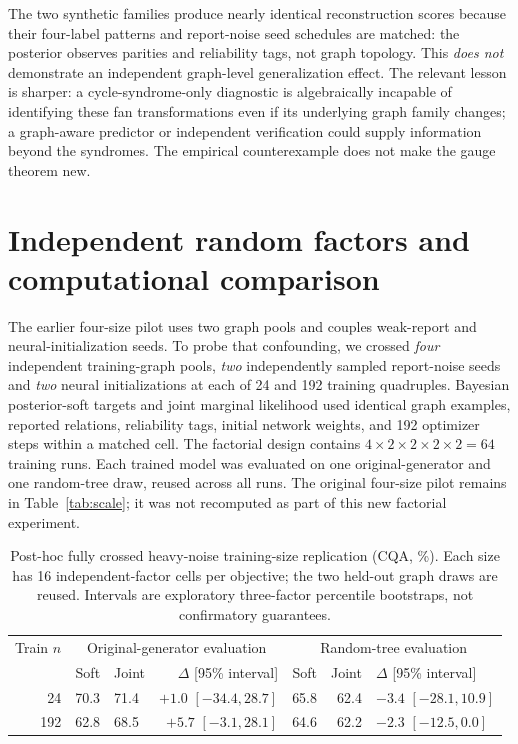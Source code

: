 \documentclass[10pt]{article}
\begin{document}
The two synthetic families produce nearly identical reconstruction scores because their four-label patterns and report-noise seed schedules are matched: the posterior observes parities and reliability tags, not graph topology. This \emph{does not} demonstrate an independent graph-level generalization effect. The relevant lesson is sharper: a cycle-syndrome-only diagnostic is algebraically incapable of identifying these fan transformations even if its underlying graph family changes; a graph-aware predictor or independent verification could supply information beyond the syndromes. The empirical counterexample does not make the gauge theorem new.

\section{Independent random factors and computational comparison}
\label{sec:factorial}
The earlier four-size pilot uses two graph pools and couples weak-report and neural-initialization seeds. To probe that confounding, we crossed \emph{four} independent training-graph pools, \emph{two} independently sampled report-noise seeds and \emph{two} neural initializations at each of 24 and 192 training quadruples. Bayesian posterior-soft targets and joint marginal likelihood used identical graph examples, reported relations, reliability tags, initial network weights, and 192 optimizer steps within a matched cell. The factorial design contains $4\times2\times2\times2\times2=64$ training runs. Each trained model was evaluated on one original-generator and one random-tree draw, reused across all runs. The original four-size pilot remains in Table~\ref{tab:scale}; it was not recomputed as part of this new factorial experiment.

\begin{table}[h]
\centering\small
\caption{Post-hoc fully crossed heavy-noise training-size replication (CQA, \%). Each size has 16 independent-factor cells per objective; the two held-out graph draws are reused. Intervals are exploratory three-factor percentile bootstraps, not confirmatory guarantees.}
\label{tab:factorial}
\begin{tabular}{rrlrrrl}
\toprule
Train $n$ & \multicolumn{3}{c}{Original-generator evaluation} & \multicolumn{3}{c}{Random-tree evaluation}\\
 & Soft & Joint & $\Delta$ [95\% interval] & Soft & Joint & $\Delta$ [95\% interval]\\
\midrule
24 & 70.3 & 71.4 & $+1.0$ $[-34.4,28.7]$ & 65.8 & 62.4 & $-3.4$ $[-28.1,10.9]$\\
192 & 62.8 & 68.5 & $+5.7$ $[-3.1,28.1]$ & 64.6 & 62.2 & $-2.3$ $[-12.5,0.0]$\\
\bottomrule
\end{tabular}
\end{table}
\end{document}

